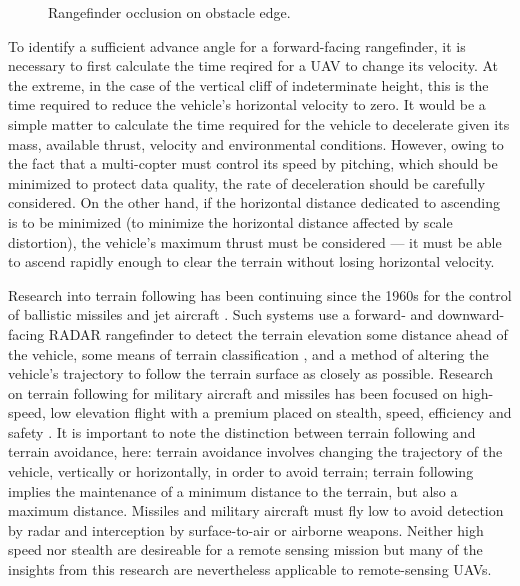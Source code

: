 \documentclass[10pt]{report}
\begin{document}
\begin{figure}
\centering
\def\svgscale{0.8}

\caption{Rangefinder occlusion on obstacle edge.}
\label{fig:uav_edge_occlude}
\end{figure}

To identify a sufficient advance angle for a forward-facing rangefinder, it is necessary to first calculate the time reqired for a UAV to change its velocity. At the extreme, in the case of the vertical cliff of indeterminate height, this is the time required to reduce the vehicle's horizontal velocity to zero. It would be a simple matter to calculate the time required for the vehicle to decelerate given its mass, available thrust, velocity and environmental conditions. However, owing to the fact that a multi-copter must control its speed by pitching, which should be minimized to protect data quality, the rate of deceleration should be carefully considered. On the other hand, if the horizontal distance dedicated to ascending is to be minimized (to minimize the horizontal distance affected by scale distortion), the vehicle's maximum thrust must be considered --- it must be able to ascend rapidly enough to clear the terrain without losing horizontal velocity.

Research into terrain following has been continuing since the 1960s for the control of ballistic missiles and jet aircraft \cite{KRACHMALNICK1968,Starling1971,Cunningham1980}. Such systems use a forward- and downward-facing RADAR rangefinder to detect the terrain elevation some distance ahead of the vehicle, some means of terrain classification \cite{Cunningham1980}, and a method of altering the vehicle's trajectory to follow the terrain surface as closely as possible. Research on terrain following for military aircraft and missiles has been focused on high-speed, low elevation flight with a premium placed on stealth, speed, efficiency and safety \cite{KRACHMALNICK1968}. It is important to note the distinction between terrain following and terrain avoidance, here: terrain avoidance involves changing the trajectory of the vehicle, vertically or horizontally, in order to avoid terrain; terrain following implies the maintenance of a minimum distance to the terrain, but also a maximum distance. Missiles and military aircraft must fly low to avoid detection by radar and interception by surface-to-air or airborne weapons. Neither high speed nor stealth are desireable for a remote sensing mission but many of the insights from this research are nevertheless applicable to remote-sensing UAVs.
\end{document}
